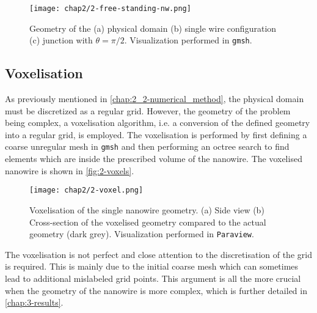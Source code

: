     \begin{figure}[H]
        \centering
        \texttt{[image: chap2/2-free-standing-nw.png]}
        \caption{Geometry of the (a) physical domain (b) single wire configuration (c) junction with $\theta = \pi/2$. Visualization performed in \texttt{gmsh}.}
        \label{fig:2-free-standing-nw}
    \end{figure}
\subsection{Voxelisation}
    As previously mentioned in \autoref{chap:2_2-numerical_method}, the physical domain must be discretized as a regular grid. However, the geometry of the problem being complex, a voxelisation algorithm, i.e. a conversion of the defined geometry into a regular grid, is employed. The voxelisation is performed by first defining a coarse unregular mesh in \texttt{gmsh} and then performing an octree search to find elements which are inside the prescribed volume of the nanowire. The voxelised nanowire is shown in \autoref{fig:2-voxels}.
    \begin{figure}[H]
        \centering
        \texttt{[image: chap2/2-voxel.png]}
        \caption{Voxelisation of the single nanowire geometry. (a) Side view (b) Cross-section of the voxelised geometry compared to the actual geometry (dark grey). Visualization performed in \texttt{Paraview}.}
        \label{fig:2-voxels}
    \end{figure}
    The voxelisation is not perfect and close attention to the discretisation of the grid is required. This is mainly due to the initial coarse mesh which can sometimes lead to additional mislabeled grid points. This argument is all the more crucial when the geometry of the nanowire is more complex, which is further detailed in \autoref{chap:3-results}. 
